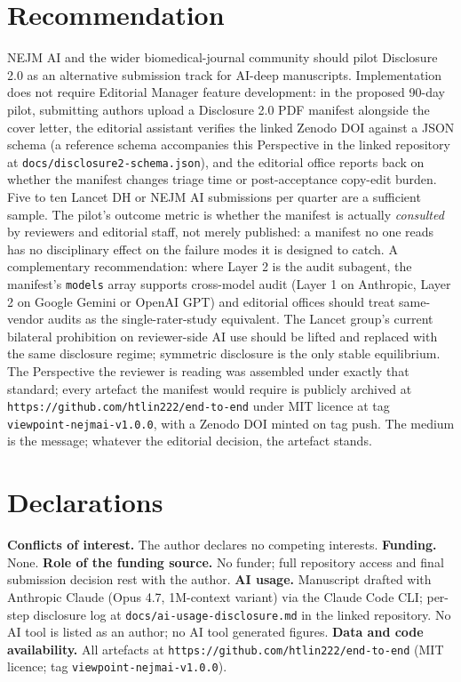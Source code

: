 \documentclass[11pt,a4paper]{article}
\begin{document}
\section{Recommendation}

NEJM AI and the wider biomedical-journal community should pilot Disclosure 2.0 as an alternative submission track for AI-deep manuscripts. Implementation does not require Editorial Manager feature development: in the proposed 90-day pilot, submitting authors upload a Disclosure 2.0 PDF manifest alongside the cover letter, the editorial assistant verifies the linked Zenodo DOI against a JSON schema (a reference schema accompanies this Perspective in the linked repository at \texttt{docs/disclosure2-schema.json}), and the editorial office reports back on whether the manifest changes triage time or post-acceptance copy-edit burden. Five to ten Lancet DH or NEJM AI submissions per quarter are a sufficient sample. The pilot's outcome metric is whether the manifest is actually \emph{consulted} by reviewers and editorial staff, not merely published: a manifest no one reads has no disciplinary effect on the failure modes it is designed to catch. A complementary recommendation: where Layer 2 is the audit subagent, the manifest's \texttt{models} array supports cross-model audit (Layer 1 on Anthropic, Layer 2 on Google Gemini or OpenAI GPT) and editorial offices should treat same-vendor audits as the single-rater-study equivalent. The Lancet group's current bilateral prohibition on reviewer-side AI use should be lifted and replaced with the same disclosure regime; symmetric disclosure is the only stable equilibrium. The Perspective the reviewer is reading was assembled under exactly that standard; every artefact the manifest would require is publicly archived at \texttt{https://github.com/htlin222/end-to-end} under MIT licence at tag \texttt{viewpoint-nejmai-v1.0.0}, with a Zenodo DOI minted on tag push. The medium is the message; whatever the editorial decision, the artefact stands.

\section*{Declarations}
\noindent\textbf{Conflicts of interest.} The author declares no competing interests. \textbf{Funding.} None. \textbf{Role of the funding source.} No funder; full repository access and final submission decision rest with the author. \textbf{AI usage.} Manuscript drafted with Anthropic Claude (Opus 4.7, 1M-context variant) via the Claude Code CLI; per-step disclosure log at \texttt{docs/ai-usage-disclosure.md} in the linked repository. No AI tool is listed as an author; no AI tool generated figures. \textbf{Data and code availability.} All artefacts at \texttt{https://github.com/htlin222/end-to-end} (MIT licence; tag \texttt{viewpoint-nejmai-v1.0.0}).



\end{document}
